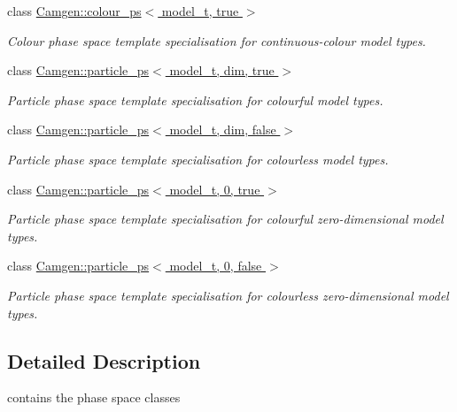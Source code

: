 \begin{DoxyCompactItemize}
class \hyperlink{a00086}{Camgen\+::colour\+\_\+ps$<$ model\+\_\+t, true $>$}
\begin{DoxyCompactList}\small\item\em Colour phase space template specialisation for continuous-\/colour model types. \end{DoxyCompactList}\item 
class \hyperlink{a00410}{Camgen\+::particle\+\_\+ps$<$ model\+\_\+t, dim, true $>$}
\begin{DoxyCompactList}\small\item\em Particle phase space template specialisation for colourful model types. \end{DoxyCompactList}\item 
class \hyperlink{a00409}{Camgen\+::particle\+\_\+ps$<$ model\+\_\+t, dim, false $>$}
\begin{DoxyCompactList}\small\item\em Particle phase space template specialisation for colourless model types. \end{DoxyCompactList}\item 
class \hyperlink{a00408}{Camgen\+::particle\+\_\+ps$<$ model\+\_\+t, 0, true $>$}
\begin{DoxyCompactList}\small\item\em Particle phase space template specialisation for colourful zero-\/dimensional model types. \end{DoxyCompactList}\item 
class \hyperlink{a00407}{Camgen\+::particle\+\_\+ps$<$ model\+\_\+t, 0, false $>$}
\begin{DoxyCompactList}\small\item\em Particle phase space template specialisation for colourless zero-\/dimensional model types. \end{DoxyCompactList}\end{DoxyCompactItemize}


\subsection{Detailed Description}
contains the phase space classes 

